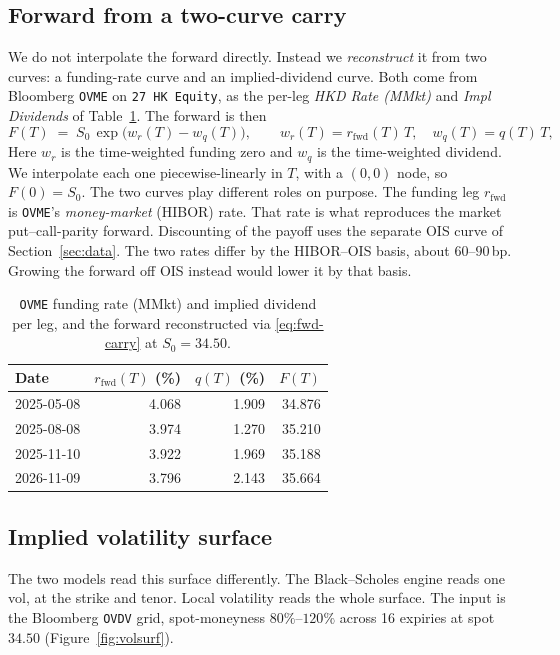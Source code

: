 \documentclass[11pt]{article}
\begin{document}
\subsection{Forward from a two-curve carry}
We do not interpolate the forward directly. Instead we \emph{reconstruct} it from two curves: a
funding-rate curve and an implied-dividend curve. Both come from Bloomberg \texttt{OVME} on
\texttt{27 HK Equity}, as the per-leg \emph{HKD Rate (MMkt)} and \emph{Impl Dividends} of
Table~\ref{tab:fwd}. The forward is then
\begin{equation}
  F(T) \;=\; S_0\,\exp\!\bigl(w_r(T)-w_q(T)\bigr),\qquad
  w_r(T)=r_{\mathrm{fwd}}(T)\,T,\quad w_q(T)=q(T)\,T,
  \label{eq:fwd-carry}
\end{equation}
Here $w_r$ is the time-weighted funding zero and $w_q$ is the time-weighted dividend. We
interpolate each one piecewise-linearly in $T$, with a $(0,0)$ node, so $F(0)=S_0$. The two curves
play different roles on purpose. The funding leg $r_{\mathrm{fwd}}$ is \texttt{OVME}'s
\emph{money-market} (HIBOR) rate. That rate is what reproduces the market put--call-parity forward.
Discounting of the payoff uses the separate OIS curve of Section~\ref{sec:data}. The two rates
differ by the HIBOR--OIS basis, about $60$--$90$\,bp. Growing the forward off OIS instead would
lower it by that basis.

\begin{table}[h]\centering\small
\begin{tabular}{@{}lrrr@{}}
\toprule
Date & $r_{\mathrm{fwd}}(T)$ (\%) & $q(T)$ (\%) & $F(T)$ \\
\midrule
2025-05-08 & 4.068 & 1.909 & 34.876 \\
2025-08-08 & 3.974 & 1.270 & 35.210 \\
2025-11-10 & 3.922 & 1.969 & 35.188 \\
2026-11-09 & 3.796 & 2.143 & 35.664 \\
\bottomrule
\end{tabular}
\caption{\texttt{OVME} funding rate (MMkt) and implied dividend per leg, and the forward
reconstructed via \eqref{eq:fwd-carry} at $S_0=34.50$. }
\label{tab:fwd}
\end{table}

\subsection{Implied volatility surface}
The two models read this surface differently. The Black--Scholes engine reads one vol, at the strike
and tenor. Local volatility reads the whole surface. The input is the Bloomberg \texttt{OVDV} grid,
spot-moneyness $80\%$--$120\%$ across 16 expiries at spot $34.50$ (Figure~\ref{fig:volsurf}). 
\end{document}
